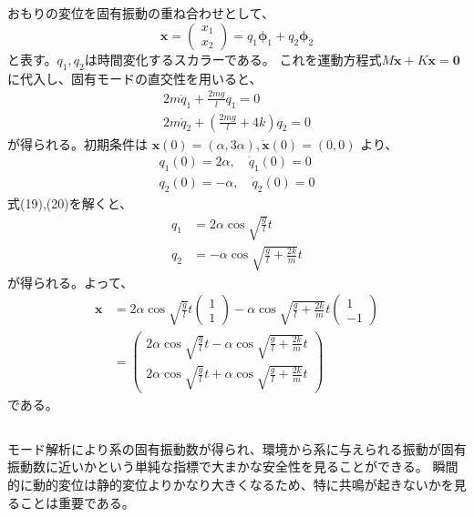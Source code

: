 \documentclass[a4paper]{jsarticle}
\begin{document}
\subsection{}
おもりの変位を固有振動の重ね合わせとして、
\begin{equation}
  \boldsymbol{x} =
  \begin{pmatrix}
    x_1 \\ x_2
  \end{pmatrix} =
  q_1 \boldsymbol{\phi}_1 + q_2 \boldsymbol{\phi}_2
\end{equation}
と表す。$q_1, q_2$は時間変化するスカラーである。
これを運動方程式$M \ddot{\boldsymbol{x}} + K \boldsymbol{x} = \boldsymbol{0}$に代入し、固有モードの直交性を用いると、
\begin{equation}
  \begin{aligned}
    2 m \ddot{q}_1 + \frac{2mg}{l} q_1 = 0 \\
    2 m \ddot{q}_2 + \left(\frac{2mg}{l} + 4k\right) q_2 = 0
  \end{aligned}
\end{equation}
が得られる。初期条件は
$\boldsymbol{x}(0) = (\alpha, 3 \alpha), \dot{\boldsymbol{x}}(0) = (0, 0)$
より、
\begin{equation}
  \begin{aligned}
    q_1(0) = 2 \alpha, \quad \dot{q}_1(0) = 0 \\
    q_2(0) = -\alpha, \quad \dot{q}_2(0) = 0
  \end{aligned}
\end{equation}
式(19),(20)を解くと、
\begin{equation}
  \begin{aligned}
    q_1 &= 2 \alpha \cos \sqrt{\frac{g}{l}} t \\
    q_2 &= -\alpha \cos \sqrt{\frac{g}{l} + \frac{2k}{m}} t
  \end{aligned}
\end{equation}
が得られる。よって、
\begin{equation}
  \begin{aligned}
    \boldsymbol{x} &= 2 \alpha \cos \sqrt{\frac{g}{l}} t
    \begin{pmatrix}
      1 \\ 1
    \end{pmatrix} -\alpha \cos \sqrt{\frac{g}{l} + \frac{2k}{m}} t
    \begin{pmatrix}
      1 \\ -1
    \end{pmatrix} \\
    &=
    \begin{pmatrix}
      2 \alpha \cos \sqrt{\frac{g}{l}} t -\alpha \cos \sqrt{\frac{g}{l} + \frac{2k}{m}} t \\
      2 \alpha \cos \sqrt{\frac{g}{l}} t +\alpha \cos \sqrt{\frac{g}{l} + \frac{2k}{m}} t
    \end{pmatrix}
  \end{aligned}
\end{equation}
である。
\subsection{}
モード解析により系の固有振動数が得られ、環境から系に与えられる振動が固有振動数に近いかという単純な指標で大まかな安全性を見ることができる。
瞬間的に動的変位は静的変位よりかなり大きくなるため、特に共鳴が起きないかを見ることは重要である。
\end{document}

